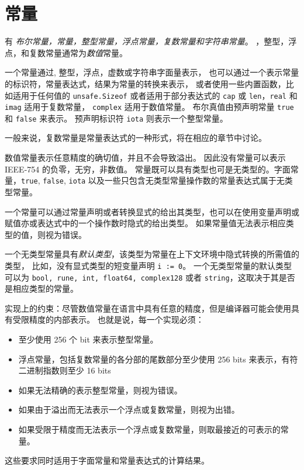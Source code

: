 
\chapter{常量}
有 \emph{布尔常量，\rune{}常量，整型常量，浮点常量，复数常量和字符串常量}。
\rune{}，整型，浮点，和复数常量通常为\emph{数值}常量。

一个常量通过\rune{}, 整型，浮点，虚数或字符串字面量表示，
也可以通过一个表示常量的标识符，常量表达式，结果为常量的转换来表示，
或者使用一些内置函数，比如适用于任何值的 \lstinline|unsafe.Sizeof| 或者适用于部分表达式的 \lstinline|cap| 或 \lstinline|len|，\lstinline|real| 和 \lstinline|imag| 适用于复数常量，
\lstinline|complex| 适用于数值常量。
布尔真值由预声明常量 \lstinline|true| 和 \lstinline|false| 来表示。
预声明标识符 \lstinline|iota| 则表示一个整型常量。

一般来说，复数常量是常量表达式的一种形式，将在相应的章节中讨论。

数值常量表示任意精度的确切值，并且不会导致溢出。
因此没有常量可以表示 IEEE-754 的负零，无穷，非数值。
常量既可以具有类型也可是无类型的。字面常量，\lstinline|true|, \lstinline|false|, \lstinline|iota| 以及一些只包含无类型常量操作数的常量表达式属于无类型常量。

一个常量可以通过常量声明或者转换显式的给出其类型，也可以在使用变量声明或赋值亦或表达式中的一个操作数时隐式的给出类型。
如果常量值无法表示相应类型的值，则视为错误。

一个无类型常量具有\emph{默认类型}，该类型为常量在上下文环境中隐式转换的所需值的类型，
比如，没有显式类型的短变量声明 \lstinline|i := 0|。
一个无类型常量的默认类型可以为 \lstinline|bool, rune, int, float64, complex128| 或者 \lstinline|string|，这取决于其是否是相应类型的常量。

实现上的约束：尽管数值常量在语言中具有任意的精度，但是编译器可能会使用具有受限精度的内部表示。
也就是说，每一个实现必须：
\begin{itemize}
\item 至少使用 256 个 bit 来表示整型常量。
\item 浮点常量，包括复数常量的各分部的尾数部分至少使用 256 bits 来表示，有符二进制指数则至少 16 bits
\item 如果无法精确的表示整型常量，则视为错误。
\item 如果由于溢出而无法表示一个浮点或复数常量，则视为出错。
\item 如果受限于精度而无法表示一个浮点或复数常量，则取最接近的可表示的常量。
\end{itemize}
这些要求同时适用于字面常量和常量表达式的计算结果。